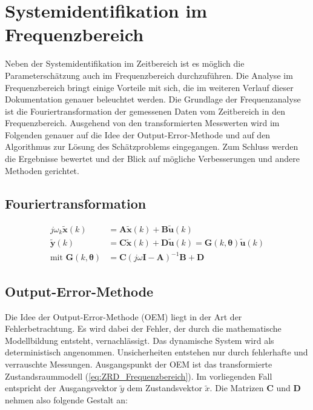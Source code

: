 \chapter{Systemidentifikation im Frequenzbereich}

Neben der Systemidentifikation im Zeitbereich ist es möglich die Parameterschätzung auch im Frequenzbereich durchzuführen. 
Die Analyse im Frequenzbereich bringt einige Vorteile mit sich, die im weiteren Verlauf dieser Dokumentation genauer 
beleuchtet werden. Die Grundlage der Frequenzanalyse ist die Fouriertransformation der gemessenen Daten vom Zeitbereich in 
den Frequenzbereich. Ausgehend von den transformierten Messwerten wird im Folgenden genauer auf die Idee der 
Output-Error-Methode und auf den Algorithmus zur Lösung des Schätzproblems eingegangen. Zum Schluss werden die Ergebnisse 
bewertet und der Blick auf mögliche Verbesserungen und andere Methoden gerichtet.


\section{Fouriertransformation}  

\begin{align}
	j\omega_{k}\mathbf{\tilde{x}}(k)  &= \mathbf{A\tilde{x}}(k) + \mathbf{B\tilde{u}}(k) \nonumber \\
 	\mathbf{\tilde{y}}(k)             &= \mathbf{C\tilde{x}}(k) + \mathbf{D\tilde{u}}(k) = \mathbf{G}(k,\mathbf{\theta})\mathbf{\tilde{u}}(k) \nonumber \\
 	\text{mit }\mathbf{G}(k,\mathbf{\theta}) &= \mathbf{C}(j\omega\mathbf{I}-\mathbf{A})^{-1}\mathbf{B}+\mathbf{D}
	\label{eq:ZRD_Frequenzbereich}
\end{align}



\section{Output-Error-Methode}

Die Idee der Output-Error-Methode (OEM) liegt in der Art der Fehlerbetrachtung. Es wird dabei der Fehler, der durch die 
mathematische Modellbildung entsteht, vernachlässigt. Das dynamische System wird als deterministisch angenommen. 
Unsicherheiten entstehen nur durch fehlerhafte und verrauschte Messungen. Ausgangspunkt der OEM ist das transformierte 
Zustandsraummodell (\ref{eq:ZRD_Frequenzbereich}). Im vorliegenden Fall entspricht der Ausgangsvektor $\tilde{y}$ dem 
Zustandsvektor $\tilde{x}$. Die Matrizen $\mathbf{C}$ und $\mathbf{D}$ nehmen also folgende Gestalt an:

